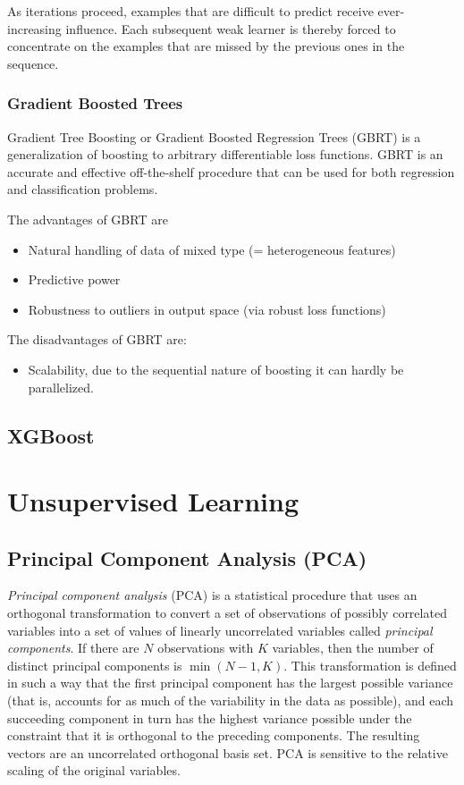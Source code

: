 \documentclass[11pt]{article}
\theoremstyle{plain}
\theoremstyle{definition}
\begin{document}
As iterations proceed, examples that are difficult to predict receive ever-increasing influence. Each subsequent weak learner is thereby forced to concentrate on the examples that are missed by the previous ones in the sequence.

\subsubsection{Gradient Boosted Trees}
Gradient Tree Boosting or Gradient Boosted Regression Trees (GBRT) is a generalization of boosting to arbitrary differentiable loss functions. GBRT is an accurate and effective off-the-shelf procedure that can be used for both regression and classification problems. 

The advantages of GBRT are
\begin{itemize}
\item Natural handling of data of mixed type (= heterogeneous features)
\item Predictive power
\item Robustness to outliers in output space (via robust loss functions)
\end{itemize}

The disadvantages of GBRT are:
\begin{itemize}
	\item Scalability, due to the sequential nature of boosting it can hardly be parallelized.
\end{itemize}

\subsection{XGBoost}



\section{Unsupervised Learning}

\subsection{Principal Component Analysis (PCA)}
\textit{Principal component analysis} (PCA) is a statistical procedure that uses an orthogonal transformation to convert a set of observations of possibly correlated variables into a set of values of linearly uncorrelated variables called \textit{principal components}. If there are $N$ observations with $K$ variables, then the number of distinct principal components is  $\min(N-1,K)$. This transformation is defined in such a way that the first principal component has the largest possible variance (that is, accounts for as much of the variability in the data as possible), and each succeeding component in turn has the highest variance possible under the constraint that it is orthogonal to the preceding components. The resulting vectors are an uncorrelated orthogonal basis set. PCA is sensitive to the relative scaling of the original variables.
\end{document}
